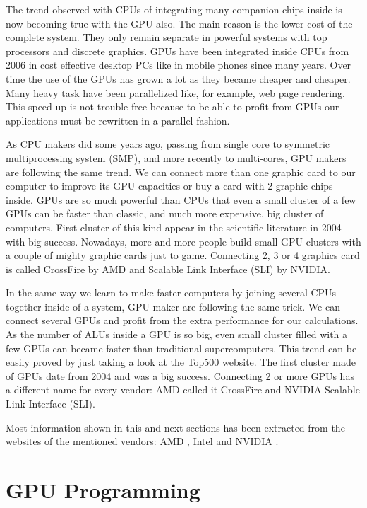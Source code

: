 \documentclass{article}
\begin{document}
The trend observed with CPUs of integrating many companion chips inside is now becoming true with the GPU also. The main reason is the lower cost of the complete system. They only remain separate in powerful systems with top processors and discrete graphics. GPUs have been integrated inside CPUs from 2006 in cost effective desktop PCs like in mobile phones since many years. Over time the use of the GPUs has grown a lot as they became cheaper and cheaper. Many heavy task have been parallelized like, for example, web page rendering. This speed up is not trouble free because to be able to profit from GPUs our applications must be rewritten in a parallel fashion.

As CPU makers did some years ago, passing from single core to symmetric multiprocessing system (SMP), and more recently to multi-cores, GPU makers are following the same trend. We can connect more than one graphic card to our computer to improve its GPU capacities or buy a card with 2 graphic chips inside. GPUs are so much powerful than CPUs that even a small cluster of a few GPUs can be faster than classic, and much more expensive, big cluster of computers. First cluster of this kind appear in the scientific literature in 2004 \cite{10.1109/SC.2004.26} with big success. Nowadays, more and more people build small GPU clusters with a couple of mighty graphic cards just to game. Connecting 2, 3 or 4 graphics card is called CrossFire by AMD and Scalable Link Interface (SLI) by NVIDIA.

In the same way we learn to make faster computers by joining several CPUs together inside of a system, GPU maker are following the same trick. We can connect several GPUs and profit from the extra performance for our calculations. As the number of ALUs inside a GPU is so big, even small cluster filled with a few GPUs can became faster than traditional supercomputers. This trend can be easily proved by just taking a look at the Top500 website. The first cluster made of GPUs date from 2004 \cite{10.1109/SC.2004.26} and was a big success. Connecting 2 or more GPUs has a different name for every vendor: AMD called it CrossFire and NVIDIA Scalable Link Interface (SLI).

Most information shown in this and next sections has been extracted from the websites of the mentioned vendors: AMD \cite{amd}, Intel \cite{intel} and NVIDIA \cite{nvidia}.


\section{GPU Programming}
\label{sec:programming}
\end{document}
